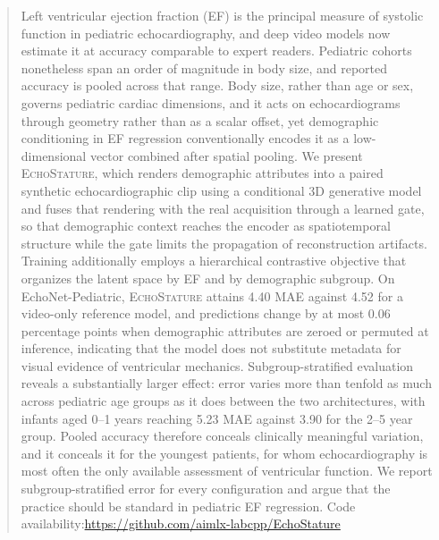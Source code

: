 \documentclass{ws-procs11x85}
\begin{document}
\begin{abstract}
Left ventricular ejection fraction (EF) is the principal measure of systolic function in pediatric echocardiography, and deep video models now estimate it at accuracy comparable to expert readers.
Pediatric cohorts nonetheless span an order of magnitude in body size, and reported accuracy is pooled across that range.
Body size, rather than age or sex, governs pediatric cardiac dimensions, and it acts on echocardiograms through geometry rather than as a scalar offset, yet demographic conditioning in EF regression conventionally encodes it as a low-dimensional vector combined after spatial pooling.
We present \textsc{EchoStature}, which renders demographic attributes into a paired synthetic echocardiographic clip using a conditional 3D generative model and fuses that rendering with the real acquisition through a learned gate, so that demographic context reaches the encoder as spatiotemporal structure while the gate limits the propagation of reconstruction artifacts.
Training additionally employs a hierarchical contrastive objective that organizes the latent space by EF and by demographic subgroup.
On EchoNet-Pediatric, \textsc{EchoStature} attains 4.40 MAE against 4.52 for a video-only reference model, and predictions change by at most 0.06 percentage points when demographic attributes are zeroed or permuted at inference, indicating that the model does not substitute metadata for visual evidence of ventricular mechanics.
Subgroup-stratified evaluation reveals a substantially larger effect: error varies more than tenfold as much across pediatric age groups as it does between the two architectures, with infants aged 0--1 years reaching 5.23 MAE against 3.90 for the 2--5 year group.
Pooled accuracy therefore conceals clinically meaningful variation, and it conceals it for the youngest patients, for whom echocardiography is most often the only available assessment of ventricular function.
We report subgroup-stratified error for every configuration and argue that the practice should be standard in pediatric EF regression. Code availability:\href{github}{https://github.com/aimlx-labcpp/EchoStature}
\end{abstract}


\end{document}
